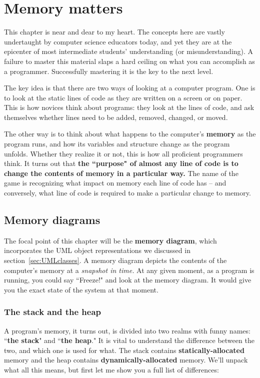 
\chapter{Memory matters}

This chapter is near and dear to my heart. The concepts here are vastly
undertaught by computer science educators today, and yet they are at the
epicenter of most intermediate students' understanding (or misunderstanding).
A failure to master this material slaps a hard ceiling on what you can
accomplish as a programmer. Successfully mastering it is the key to the next
level.

The key idea is that there are two ways of looking at a computer program. One
is to look at the static lines of code as they are written on a screen or on
paper. This is how novices think about programs: they look at the lines of
code, and ask themselves whether lines need to be added, removed, changed, or
moved.

The other way is to think about what happens to the computer's \textbf{memory}
as the program runs, and how its variables and structure change as the program
unfolds. Whether they realize it or not, this is how all proficient
programmers think. It turns out that \textbf{the ``purpose" of almost any line
of code is to change the contents of memory in a particular way.} The name of
the game is recognizing what impact on memory each line of code has -- and
conversely, what line of code is required to make a particular change to
memory.

\section{Memory diagrams}

The focal point of this chapter will be the \textbf{memory diagram}, which
incorporates the UML object representations we discussed in
section~\ref{sec:UMLclasses}. A memory diagram depicts the contents of the
computer's memory at a \textit{snapshot in time.} At any given moment, as a
program is running, you could say ``Freeze!" and look at the memory diagram.
It would give you the exact state of the system at that moment.

\subsection{The stack and the heap}

A program's memory, it turns out, is divided into two realms with funny names:
``\textbf{the stack}" and ``\textbf{the heap}." It is vital to understand the
difference between the two, and which one is used for what. The stack contains
\textbf{statically-allocated} memory and the heap contains
\textbf{dynamically-allocated} memory. We'll unpack what all this means, but
first let me show you a full list of differences:

